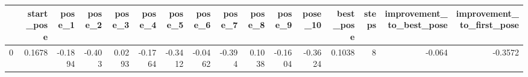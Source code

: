 \begin{tabular}{lrrrrrrrrrrrrrrr}
\toprule
{} &  start\_pose &  pose\_1 &  pose\_2 &  pose\_3 &  pose\_4 &  pose\_5 &  pose\_6 &  pose\_7 &  pose\_8 &  pose\_9 &  pose\_10 &  best\_pose &  steps &  improvement\_to\_best\_pose &  improvement\_to\_first\_pose \\
\midrule
0 &      0.1678 & -0.1894 &  -0.403 &  0.0293 & -0.1764 & -0.3412 & -0.0462 &  -0.394 &  0.1038 & -0.1604 &  -0.3624 &     0.1038 &      8 &                    -0.064 &                    -0.3572 \\
\bottomrule
\end{tabular}
